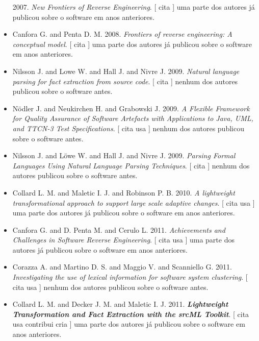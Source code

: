 \begin{itemize}
      2007.
        \textit{ New Frontiers of Reverse Engineering}.
      [
          cita
      ]
uma parte dos autores já publicou sobre o software em anos anteriores.
\item Canfora G. and Penta D. M.
      2008.
        \textit{ Frontiers of reverse engineering: A conceptual model}.
      [
          cita
      ]
uma parte dos autores já publicou sobre o software em anos anteriores.
\item Nilsson J. and Lowe W. and Hall J. and Nivre J.
      2009.
        \textit{ Natural language parsing for fact extraction from source code}.
      [
          cita
      ]
nenhum dos autores publicou sobre o software antes.
\item Nödler J. and Neukirchen H. and Grabowski J.
      2009.
        \textit{ A Flexible Framework for Quality Assurance of Software Artefacts with Applications to Java, UML, and TTCN-3 Test Specifications}.
      [
          cita
          usa
      ]
nenhum dos autores publicou sobre o software antes.
\item Nilsson J. and L\"{o}we W. and Hall J. and Nivre J.
      2009.
        \textit{ Parsing Formal Languages Using Natural Language Parsing Techniques}.
      [
          cita
      ]
nenhum dos autores publicou sobre o software antes.
\item Collard L. M. and Maletic I. J. and Robinson P. B.
      2010.
        \textit{ A lightweight transformational approach to support large scale adaptive changes}.
      [
          cita
          usa
      ]
uma parte dos autores já publicou sobre o software em anos anteriores.
\item Canfora G. and D. Penta M. and Cerulo L.
      2011.
        \textit{ Achievements and Challenges in Software Reverse Engineering}.
      [
          cita
          usa
      ]
uma parte dos autores já publicou sobre o software em anos anteriores.
\item Corazza A. and Martino D. S. and Maggio V. and Scanniello G.
      2011.
        \textit{ Investigating the use of lexical information for software system clustering}.
      [
          cita
          usa
      ]
nenhum dos autores publicou sobre o software antes.
\item Collard L. M. and Decker J. M. and Maletic I. J.
      2011.
        \textbf{\textit{ Lightweight Transformation and Fact Extraction with the srcML Toolkit}}.
      [
          cita
          usa
          contribui
          cria
      ]
uma parte dos autores já publicou sobre o software em anos anteriores.

\end{itemize}
